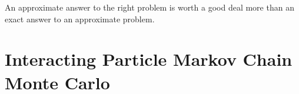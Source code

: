 
\begin{savequote}[8cm]
	An approximate answer to the right problem is worth a good deal more than 
	an exact answer to an approximate problem.
\end{savequote}


\section{Interacting Particle Markov Chain Monte Carlo}
\label{sec:part:ipmcmc}




